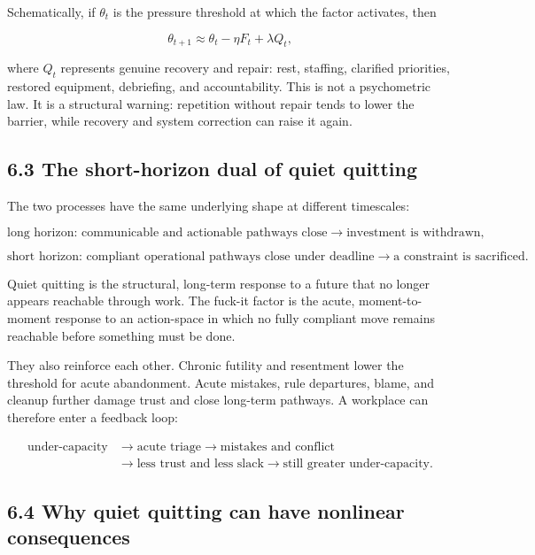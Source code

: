 \documentclass[11pt,oneside]{article}
\begin{document}
Schematically, if \(\theta_t\) is the pressure threshold at which the
factor activates, then

\[
\theta_{t+1}
\approx
\theta_t - \eta F_t + \lambda Q_t,
\]

where \(Q_t\) represents genuine recovery and repair: rest, staffing,
clarified priorities, restored equipment, debriefing, and
accountability. This is not a psychometric law. It is a structural
warning: repetition without repair tends to lower the barrier, while
recovery and system correction can raise it again.

\subsection{6.3 The short-horizon dual of quiet
quitting}\label{the-short-horizon-dual-of-quiet-quitting}

The two processes have the same underlying shape at different
timescales:

\[
\text{long horizon: communicable and actionable pathways close}
\longrightarrow
\text{investment is withdrawn},
\]

\[
\text{short horizon: compliant operational pathways close under deadline}
\longrightarrow
\text{a constraint is sacrificed}.
\]

Quiet quitting is the structural, long-term response to a future that no
longer appears reachable through work. The fuck-it factor is the acute,
moment-to-moment response to an action-space in which no fully compliant
move remains reachable before something must be done.

They also reinforce each other. Chronic futility and resentment lower
the threshold for acute abandonment. Acute mistakes, rule departures,
blame, and cleanup further damage trust and close long-term pathways. A
workplace can therefore enter a feedback loop:

\[
\begin{aligned}
\text{under-capacity}
&\rightarrow
\text{acute triage}
\rightarrow
\text{mistakes and conflict}
\\
&\rightarrow
\text{less trust and less slack}
\rightarrow
\text{still greater under-capacity}.
\end{aligned}
\]

\subsection{6.4 Why quiet quitting can have nonlinear
consequences}\label{why-quiet-quitting-can-have-nonlinear-consequences}
\end{document}

